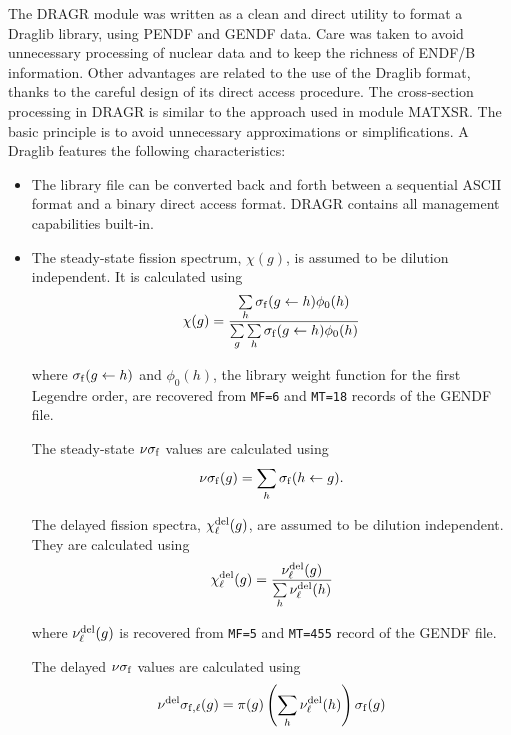 The DRAGR module was written as a clean and direct utility to format a Draglib
library, using PENDF and GENDF data. Care was taken to avoid unnecessary
processing of nuclear data and to keep the richness of ENDF/B information.
Other advantages are related to the use of the Draglib format, thanks to the
careful design of its direct access procedure. The cross-section processing in
DRAGR is similar to the  approach used in module \uppercase{matxsr}. The basic
principle is to avoid unnecessary approximations or simplifications. A Draglib
features the following characteristics:
\begin{itemize}
\item The library file can be converted back and forth between a sequential
ASCII format and a binary direct access format. DRAGR contains all management
capabilities built-in.
\item The steady-state fission spectrum, $\chi(g)$, is assumed to be dilution
independent. It is calculated using
\begin{equation}
\chi(g)={\sum\limits_h \sigma_{\rm f}(g \leftarrow h) \phi_0(h) \over
\sum\limits_g\sum\limits_h\sigma_{\rm f}(g \leftarrow h) \phi_0(h)}
\label{eq:eq1_605}
\end{equation}

where $\sigma_{\rm f}(g \leftarrow h)$ and $\phi_0(h)$, the library weight
function for the first Legendre order,  are recovered from {\tt MF=6} and
{\tt MT=18} records of the GENDF file.

\vskip 0.08cm

The steady-state $\nu\sigma_{\rm f}$ values are calculated using
\begin{equation}
\nu\sigma_{\rm f}(g)=\sum_h \sigma_{\rm f}(h \leftarrow g) .
\label{eq:eq1_606}
\end{equation}

\vskip 0.08cm

The delayed fission spectra, $\chi^{\rm del}_\ell(g)$, are assumed to be
dilution independent. They are calculated using
\begin{equation}
\chi^{\rm del}_\ell(g)={ \nu^{\rm del}_\ell(g)\over
\sum\limits_h\nu^{\rm del}_\ell(h) }
\label{eq:eq1_607}
\end{equation}

where $\nu^{\rm del}_\ell(g)$ is recovered from {\tt MF=5} and {\tt MT=455}
record of the GENDF file.

\vskip 0.08cm

The delayed $\nu\sigma_{\rm f}$ values are calculated using
\begin{equation}
\nu^{\rm del}\sigma_{{\rm f},\ell}(g)=\pi(g)\left(
\sum_h\nu^{\rm del}_\ell(h)\right)\sigma_{\rm f}(g)
\label{eq:eq1_608}
\end{equation}


\end{itemize}
